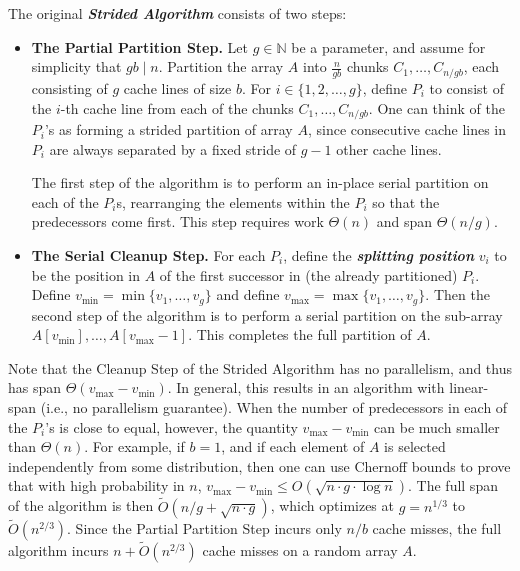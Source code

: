 \documentclass[sigconf, 10pt, nonacm]{acmart}
\newcommand{\defn}[1]{{\textit{\textbf{\boldmath #1}}}}
\theoremstyle{remark}
\theoremstyle{remark}
\begin{document}
The original \defn{Strided Algorithm} consists of two steps: 
\begin{itemize}
\item \textbf{The Partial Partition Step.} Let $g \in \mathbb{N}$ be a
  parameter, and assume for simplicity that $gb \mid n$. Partition the
  array $A$ into $\frac{n}{gb}$ chunks $C_1, \ldots, C_{n / gb}$,
  each consisting of $g$ cache lines of size $b$.
	For $i \in \{1, 2, \ldots, g\}$, define 
  $P_i$ to consist of the $i$-th cache line from each of the
  chunks $C_1, \ldots, C_{n / gb}$. One can think of the $P_i$'s
	as forming a strided partition of array $A$, since
  consecutive cache lines in $P_i$ are always separated by a fixed
  stride of $g - 1$ other cache lines.

  The first step of the algorithm is to perform an in-place serial
  partition on each of the $P_i$s, rearranging the elements within the
  $P_i$ so that the predecessors come first. This step requires work
  $\Theta(n)$ and span $\Theta(n/g)$.
\item \textbf{The Serial Cleanup Step. }For each $P_i$, define the
  \defn{splitting position} $v_i$ to be
  the position in $A$ of the first successor in (the already
  partitioned) $P_i$. Define $v_{\text{min}} = \min\{v_1, \ldots,
  v_{g}\}$ and define $v_{\text{max}} = \max\{v_1, \ldots, v_{g}\}$. Then the
  second step of the algorithm is to perform a serial partition on the
	sub-array \\$A[v_{\text{min}}],\ldots, A[v_{\text{max}}-1]$. This completes the   
    full partition of $A$.
\end{itemize}

Note that the Cleanup Step of the Strided Algorithm has no
parallelism, and thus has span $\Theta(v_{\text{max}} -
v_{\text{min}})$.  In general, this results in an algorithm with
linear-span (i.e., no parallelism guarantee).  When the number of
predecessors in each of the $P_i$'s is close to equal, however, the
quantity $v_{\text{max}} - v_{\text{min}}$ can be much smaller than
$\Theta(n)$. For example, if $b = 1$, and if each element of $A$ is
selected independently from some distribution, then one can use
Chernoff bounds to prove that with high probability in $n$,
$v_{\text{max}} - v_{\text{min}} \le O(\sqrt{n \cdot g \cdot \log
  n})$.  The full span of the algorithm is then $\tilde{O}(n/g +
\sqrt{n \cdot g})$, which optimizes at $g = n^{1/3}$ to
$\tilde{O}(n^{2/3})$. Since the Partial Partition Step incurs only $n
/ b$ cache misses, the full algorithm incurs $n + \tilde{O}(n^{2/3})$ cache
misses on a random array $A$.
\end{document}
